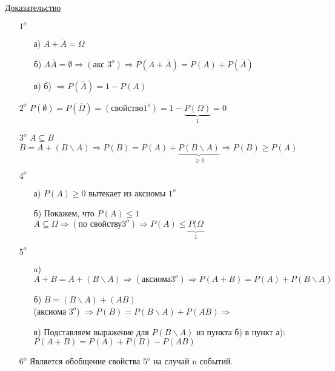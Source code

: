 \underline{Доказательство}
\begin{enumerate}
	\item[$1^o$]
	\begin{enumerate}
		\item[а)]
		$A + \overline{A} = \Omega$
		
		\item[б)]
		$A \overline{A} = \emptyset \Rightarrow (\text{акс } 3^o) \Rightarrow P(A + \overline{A}) = P(A) + P(\overline{A})$
		
		\item[в)]
		б) $\Rightarrow P(\overline{A}) = 1 - P(A)$
	\end{enumerate}
	
	\item[$2^o$]
	$P(\emptyset) = P(\overline{\Omega}) = (\text{свойство} 1^o) = 1 - \underbrace{P(\Omega)}_{1} = 0$
	
	\item[$3^o$]
	$A \subseteq B$ \\
	$B = A + (B \backslash A) \Rightarrow P(B) = P(A) + \underbrace{P(B \backslash A)}_{\geqslant 0} \Rightarrow P(B) \geqslant P(A)$
	
	\item[$4^o$]
	\begin{enumerate}
		\item[а)]
		$P(A) \geqslant 0$ вытекает из аксиомы $1^o$
		
		\item[б)] 
		Покажем, что $P(A) \leqslant 1$ $A \subseteq \Omega \Rightarrow (\text{по свойству} 3^o) \Rightarrow P(A) \leqslant \underbrace{P(\Omega}_{1}$
	\end{enumerate}
	
	\item[$5^o$]
	\begin{enumerate}
		\item[a)]
		$A + B = A + (B \backslash A) \Rightarrow (\text{аксиома} 3^o) \Rightarrow P(A + B) = P(A) + P(B \backslash A)$
		
		\item[б)]
		$B = (B \backslash A) + (AB)$ \\
		(аксиома $3^o$) $\Rightarrow P(B) = P(B \backslash A) + P(AB) \Rightarrow$  
		
		\item[в)] 
		Подставляем выражение для $P(B \backslash A)$ из пункта б) в пункт а): $P(A+B) = P(A) + P(B) - P(AB)$
	\end{enumerate}
	
	\item[$6^o$]
	Является обобщение свойства $5^o$ на случай n событий.
\end{enumerate}

